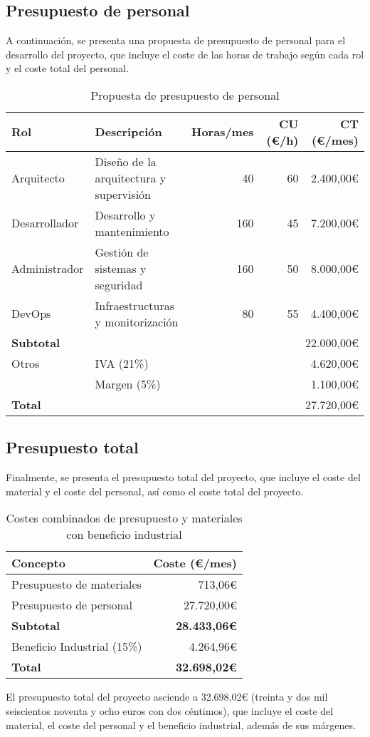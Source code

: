 \subsection{Presupuesto de personal}\label{subsec:pres_personal}
A continuación, se presenta una propuesta de presupuesto de personal para el
desarrollo del proyecto, que incluye el coste de las horas de trabajo según
cada rol y el coste total del personal.

\begin{table}[h]
	\centering
	\small
	\begin{tabular}{|l|l|r|r|r|}
	\hline
	\textbf{Rol} & \textbf{Descripción} & \textbf{Horas/mes} & \textbf{CU (€/h)} & \textbf{CT (€/mes)} \\
	\hline
	\hline
	Arquitecto & Diseño de la arquitectura y supervisión & 40 & 60 & 2.400,00€ \\
	\hline
	Desarrollador & Desarrollo y mantenimiento & 160 & 45 & 7.200,00€ \\
	\hline
	Administrador & Gestión de sistemas y seguridad & 160 & 50 & 8.000,00€ \\
	\hline
	DevOps & Infraestructuras y monitorización & 80 & 55 & 4.400,00€ \\
	\hline
	\textbf{Subtotal} & \multicolumn{4}{r|}{22.000,00€} \\
	\hline
	\hline
	Otros & \multicolumn{3}{|l|}{IVA (21\%)} & 4.620,00€ \\
	 & \multicolumn{3}{|l|}{Margen (5\%)} & 1.100,00€ \\
	\hline
	\textbf{Total} & \multicolumn{4}{r|}{27.720,00€} \\
	\hline
	\end{tabular}
	\caption{Propuesta de presupuesto de personal}
	\label{tab:presupuesto_personal_aws}
\end{table}


\subsection{Presupuesto total}\label{subsec:pres_total}
Finalmente, se presenta el presupuesto total del proyecto, que incluye el coste
del material y el coste del personal, así como el coste total del proyecto.

\begin{table}[h]
	\centering
	\small
	\begin{tabular}{|l|r|}
	\hline
	\textbf{Concepto} & \textbf{Coste (€/mes)} \\
	\hline
	Presupuesto de materiales & 713,06€ \\
	\hline
	Presupuesto de personal & 27.720,00€ \\
	\hline
	\textbf{Subtotal} & \textbf{28.433,06€} \\
	\hline
	\hline
	Beneficio Industrial (15\%) & 4.264,96€ \\
	\hline
	\textbf{Total} & \textbf{32.698,02€} \\
	\hline
	\end{tabular}
	\caption{Costes combinados de presupuesto y materiales con beneficio industrial}
	\label{tab:costes_combinados}
\end{table}

El presupuesto total del proyecto asciende a 32.698,02€ (treinta y dos mil
seiscientos noventa y ocho euros con dos céntimos), que incluye el coste del
material, el coste del personal y el beneficio industrial, además de sus
márgenes.
